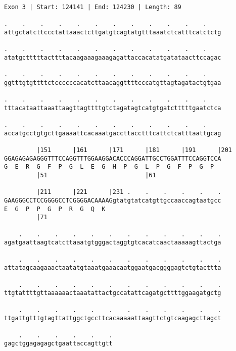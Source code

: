 \documentclass{article}
\begin{document}
\newpage
\begin{Verbatim}
Exon 3 | Start: 124141 | End: 124230 | Length: 89
 
.    .    .    .    .    .    .    .    .    .    .    .    
attgctatcttccctattaaactcttgatgtcagtatgtttaaatctcatttcatctctg
  
.    .    .    .    .    .    .    .    .    .    .    .    
atatgctttttacttttacaagaaagaaagagattaccacatatgatataacttccagac
  
.    .    .    .    .    .    .    .    .    .    .    .    
ggtttgtgttttctccccccacatcttaacaggttttcccatgttagtagatactgtgaa
  
.    .    .    .    .    .    .    .    .    .    .    .    
tttacataattaaattaagttagttttgtctagatagtcatgtgatctttttgaatctca
  
.    .    .    .    .    .    .    .    .    .    .    .    
accatgcctgtgcttgaaaattcacaaatgaccttacctttcattctcatttaattgcag
  
         |151      |161      |171      |181      |191      |201
GGAGAGAGAGGGTTTCCAGGTTTGGAAGGACACCCAGGATTGCCTGGATTTCCAGGTCCA
G  E  R  G  F  P  G  L  E  G  H  P  G  L  P  G  F  P  G  P  
         |51                           |61                  
  
         |211      |221      |231 .    .    .    .    .    .
GAAGGGCCTCCGGGGCCTCGGGGACAAAAGgtatgtatcatgttgccaaccagtaatgcc
E  G  P  P  G  P  R  G  Q  K                                
         |71                                                
  
    .    .    .    .    .    .    .    .    .    .    .    .
agatgaattaagtcatcttaaatgtgggactaggtgtcacatcaactaaaaagttactga
  
    .    .    .    .    .    .    .    .    .    .    .    .
attatagcaagaaactaatatgtaaatgaaacaatggaatgacggggagtctgtacttta
  
    .    .    .    .    .    .    .    .    .    .    .    .
ttgtattttgttaaaaaactaaatattactgccatattcagatgcttttggaagatgctg
  
    .    .    .    .    .    .    .    .    .    .    .    .
ttgattgtttgtagttattggctgccttcacaaaaattaagttctgtcaagagcttagct
  
    .    .    .    .    .    .
gagctggagagagctgaattaccagttgtt
\end{Verbatim}
\newpage
\end{document}
